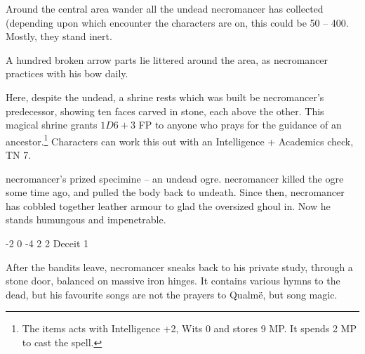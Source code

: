 \begin{multicols}{2}




Around the central area wander all the undead \gls{necromancer} has collected (depending upon which encounter the characters are on, this could be 50 -- 400.  Mostly, they stand inert.

A hundred broken arrow parts lie littered around the area, as \gls{necromancer} practices with his bow daily.


\ghoul


Here, despite the undead, a shrine rests which was built be \gls{necromancer}'s predecessor, showing ten faces carved in stone, each above the other.  This magical shrine grants $1D6 + 3$ FP to anyone who prays for the guidance of an ancestor.\footnote{The items acts with Intelligence +2, Wits 0 and stores 9 MP. It spends 2 MP to cast the spell.}  Characters can work this out with an Intelligence + Academics check, TN 7.


\Gls{necromancer}'s prized specimine -- an undead ogre.
\Gls{necromancer} killed the ogre some time ago, and pulled the body back to undeath.
Since then, \gls{necromancer} has cobbled together leather armour to glad the oversized ghoul in.
Now he stands humungous and impenetrable.


{-2}%
{0}%
{-4}%
{2}%
{2}%
{Deceit 1}%
{\partialleather}%
{}%


After the bandits leave, \gls{necromancer} sneaks back to his private study, through a stone door, balanced on massive iron hinges.  It contains various hymns to the dead, but his favourite songs are not the prayers to Qualm\"{e}, but song magic.


\end{multicols}
